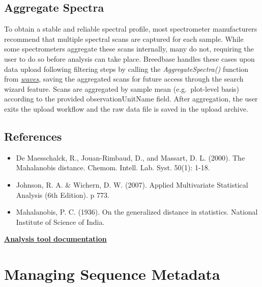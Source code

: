 \documentclass[
  12pt,
]{book}
\providecommand{\tightlist}{%
  \setlength{\itemsep}{0pt}\setlength{\parskip}{0pt}}
\begin{document}
\hypertarget{aggregate-spectra}{%
\section{Aggregate Spectra}\label{aggregate-spectra}}

To obtain a stable and reliable spectral profile, most spectrometer manufacturers recommend that multiple spectral scans are captured for each sample. While some spectrometers aggregate these scans internally, many do not, requiring the user to do so before analysis can take place. Breedbase handles these cases upon data upload following filtering steps by calling the \emph{AggregateSpectra()} function from \href{https://CRAN.R-project.org/package=waves}{\emph{waves}}, saving the aggregated scans for future access through the search wizard feature. Scans are aggregated by sample mean (e.g.~plot-level basis) according to the provided observationUnitName field. After aggregation, the user exits the upload workflow and the raw data file is saved in the upload archive.

\hypertarget{references}{%
\section{References}\label{references}}

\begin{itemize}
\tightlist
\item
  De Maesschalck, R., Jouan-Rimbaud, D., and Massart, D. L. (2000). The Mahalanobis distance. Chemom. Intell. Lab. Syst. 50(1): 1-18.
\item
  Johnson, R. A. \& Wichern, D. W. (2007). Applied Multivariate Statistical Analysis (6th Edition). p 773.
\item
  Mahalanobis, P. C. (1936). On the generalized distance in statistics. National Institute of Science of India.
\end{itemize}

\protect\hyperlink{spectral-analysis}{\textbf{Analysis tool documentation}}

\hypertarget{managing-sequence-metadata}{%
\chapter{Managing Sequence Metadata}\label{managing-sequence-metadata}}
\end{document}
